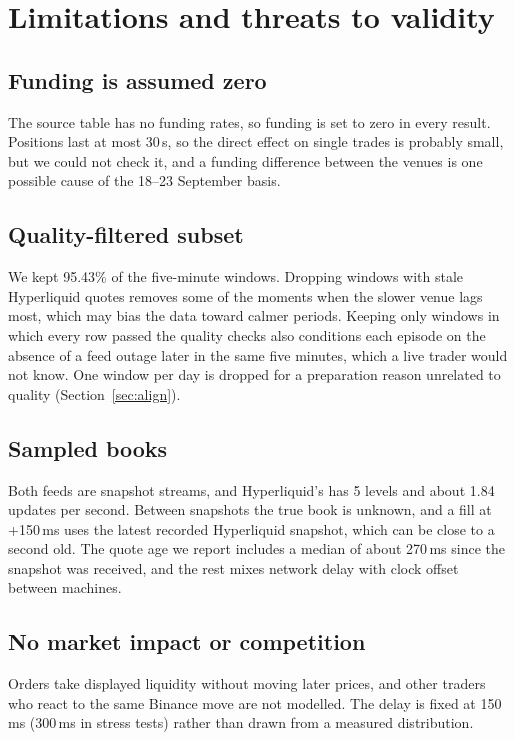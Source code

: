 \documentclass[12pt,a4paper]{article}
\begin{document}
\section{Limitations and threats to validity}\label{sec:limits}

\subsection{Funding is assumed zero}\label{sec:funding}
The source table has no funding rates, so funding is set to zero in every result. Positions
last at most 30\,s, so the direct effect on single trades is probably small, but we could not
check it, and a funding difference between the venues is one possible cause of the
18--23 September basis.

\subsection{Quality-filtered subset}\label{sec:subset}
We kept 95.43\% of the five-minute windows. Dropping windows with stale Hyperliquid quotes
removes some of the moments when the slower venue lags most, which may bias the data toward
calmer periods. Keeping only windows in which every row passed the quality checks also
conditions each episode on the absence of a feed outage later in the same five minutes,
which a live trader would not know. One window per day is dropped for a preparation reason
unrelated to quality (Section~\ref{sec:align}).

\subsection{Sampled books}
Both feeds are snapshot streams, and Hyperliquid's has 5 levels and about 1.84 updates per
second. Between snapshots the true book is unknown, and a fill at +150\,ms uses the latest
recorded Hyperliquid snapshot, which can be close to a second old. The quote age we report
includes a median of about 270\,ms since the snapshot was received, and the rest mixes
network delay with clock offset between machines.

\subsection{No market impact or competition}
Orders take displayed liquidity without moving later prices, and other traders who react to
the same Binance move are not modelled. The delay is fixed at 150\,ms (300\,ms in stress
tests) rather than drawn from a measured distribution.
\end{document}
